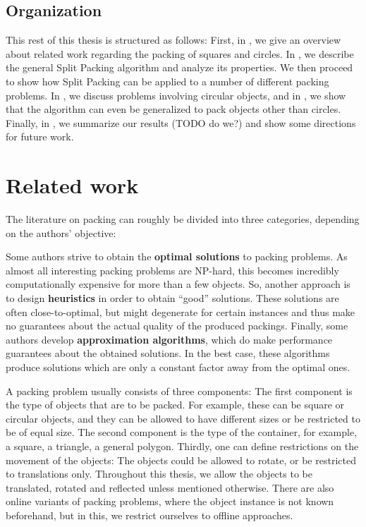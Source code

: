 \documentclass[a4paper,style=print,oneside,bibliography=totoc,nexus,lnum,extramargin]{tubsbook}
\begin{document}
\section{Organization}

This rest of this thesis is structured as follows:
First, in \textbf{}, we give an overview about related work regarding the packing of squares and circles.
In \textbf{}, we describe the general Split Packing algorithm and analyze its properties.
We then proceed to show how Split Packing can be applied to a number of different packing problems. In \textbf{}, we discuss problems involving circular objects, and in \textbf{}, we show that the algorithm can even be generalized to pack objects other than circles.
Finally, in \textbf{}, we summarize our results (TODO do we?) and show some directions for future work.

\chapter{Related work}\label{ch:related-work}

The literature on packing can roughly be divided into three categories, depending on the authors' objective:

Some authors strive to obtain the \textbf{optimal solutions} to packing problems. As almost all interesting packing problems are NP-hard, this becomes incredibly computationally expensive for more than a few objects.
So, another approach is to design \textbf{heuristics} in order to obtain “good” solutions. These solutions are often close-to-optimal, but might degenerate for certain instances and thus make no guarantees about the actual quality of the produced packings.
Finally, some authors develop \textbf{approximation algorithms}, which do make performance guarantees about the obtained solutions. In the best case, these algorithms produce solutions which are only a constant factor away from the optimal ones.

A packing problem usually consists of three components: The first component is the type of objects that are to be packed. For example, these can be square or circular objects, and they can be allowed to have different sizes or be restricted to be of equal size. The second component is the type of the container, for example, a square, a triangle, a general polygon. Thirdly, one can define restrictions on the movement of the objects: The objects could be allowed to rotate, or be restricted to translations only. Throughout this thesis, we allow the objects to be translated, rotated and reflected unless mentioned otherwise. There are also online variants of packing problems, where the object instance is not known beforehand, but in this, we restrict ourselves to offline approaches.
\end{document}
